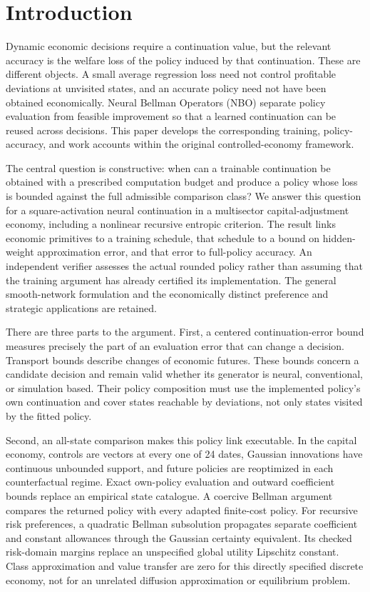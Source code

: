 \section{Introduction}\label{sec:r31introduction}
Dynamic economic decisions require a continuation value, but the relevant
accuracy is the welfare loss of the policy induced by that continuation.
These are different objects. A small average regression loss need not control
profitable deviations at unvisited states, and an accurate policy need not
have been obtained economically. Neural Bellman Operators (NBO) separate
policy evaluation from feasible improvement so that a learned continuation
can be reused across decisions. This paper develops the corresponding
training, policy-accuracy, and work accounts within the original
controlled-economy framework.

The central question is constructive: when can a trainable continuation be
obtained with a prescribed computation budget and produce a policy whose
loss is bounded against the full admissible comparison class? We answer this
question for a square-activation neural continuation in a multisector
capital-adjustment economy, including a nonlinear recursive entropic
criterion. The result links economic primitives to a training schedule,
that schedule to a bound on hidden-weight approximation error, and that
error to full-policy accuracy. An independent verifier assesses the actual
rounded policy rather than assuming that the training argument has already
certified its implementation. The general smooth-network formulation and
the economically distinct preference and strategic applications are retained.

There are three parts to the argument. First, a centered continuation-error
bound measures precisely the part of an evaluation error that can change a
decision. Transport bounds describe changes of economic futures. These
bounds concern a candidate decision and remain valid whether its generator
is neural, conventional, or simulation based. Their policy composition must
use the implemented policy's own continuation and cover states reachable by
deviations, not only states visited by the fitted policy.

Second, an all-state comparison makes this policy link executable. In the
capital economy, controls are vectors at every one of 24 dates, Gaussian
innovations have continuous unbounded support, and future policies are
reoptimized in each counterfactual regime. Exact own-policy evaluation and
outward coefficient bounds replace an empirical state catalogue. A coercive
Bellman argument compares the returned policy with every adapted finite-cost
policy. For recursive risk preferences, a quadratic Bellman subsolution
propagates separate coefficient and constant allowances through the Gaussian
certainty equivalent. Its checked risk-domain margins replace an unspecified
global utility Lipschitz constant. Class approximation and value transfer
are zero for this directly specified discrete economy, not for an unrelated
diffusion approximation or equilibrium problem.

